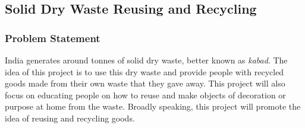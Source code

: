 \documentclass{article}
\begin{document}
\subsection{Solid Dry Waste Reusing and Recycling}
\subsubsection{Problem Statement}
India generates around tonnes of solid dry waste, better known as \textit{kabad}. The idea of this project is to use this dry waste and provide people with recycled goods made from their own waste that they gave away. This project will also focus on educating people on how to reuse and make objects of decoration or purpose at home from the waste. Broadly speaking, this project will promote the idea of reusing and recycling goods.
\end{document}

